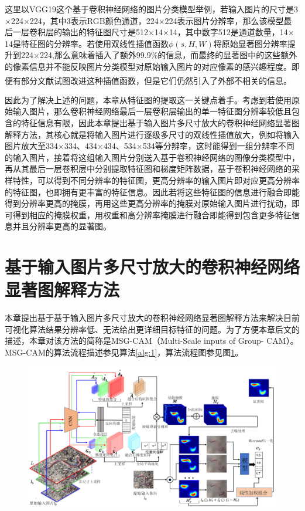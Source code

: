 这里以VGG19这个基于卷积神经网络的图片分类模型举例，若输入图片的尺寸是3$\times$224$\times$224，其中3表示RGB颜色通道，224$\times$224表示图片分辨率，那么该模型最后一层卷积层的输出的特征图尺寸是512$\times$14$\times$14，其中数字512是通道数量，14$\times$14是特征图的分辨率。若使用双线性插值函数$\phi(s,H,W)$将原始显著图分辨率提升到224$\times$224,那么意味着插入了额外99.9\%的信息，而最终的显著图中的这些额外的像素信息并不能反映图片分类模型对原始输入图片的对应像素的感兴趣程度。即便有部分文献\textsuperscript{\cite{adebayo2018sanity,selvaraju2017grad}}试图改进这种插值函数，但是它们仍然引入了外部不相关的信息。

因此为了解决上述的问题，本章从特征图的提取这一关键点着手。考虑到若使用原始输入图片，那么卷积神经网络最后一层卷积层输出的单一特征图分辨率较低且包含的特征信息有限，因此本章提出基于输入图片多尺寸放大的卷积神经网络显著图解释方法，其核心就是将输入图片进行逐级多尺寸的双线性插值放大，例如将输入图片放大至334$\times$334、434$\times$434、534$\times$534等分辨率，这时能得到一组分辨率不同的输入图片，接着将这组输入图片分别送入基于卷积神经网络的图像分类模型中，再从其最后一层卷积层中分别提取特征图和梯度矩阵数据，基于卷积神经网络的采样特性，可以得到不同分辨率的特征图，更高分辨率的输入图片即对应更高分辨率的特征图，也即拥有更丰富的特征信息。因此若将这些特征图的信息进行融合即能得到分辨率更高的掩膜，再用这些更高分辨率的掩膜对原始输入图片进行扰动，即可得到相应的掩膜权重，用权重和高分辨率掩膜进行融合即能得到包含更多特征信息并且分辨率更高的显著图。


\section{基于输入图片多尺寸放大的卷积神经网络显著图解释方法}\label{3:method}
本章提出基于基于输入图片多尺寸放大的卷积神经网络显著图解释方法来解决目前可视化算法结果分辨率低、无法给出更详细目标特征的问题。为了方便本章后文的描述，本章对该方法的简称是MSG-CAM（Multi-Scale inputs of Group-
CAM）。MSG-CAM的算法流程描述参见算法\ref{alg:1}，算法流程图参见图\ref{fig:msg_pipeline}。

\begin{figure}[!ht]
	\centering 
	\includegraphics[width=15cm]{fig/ch3/msg_pipeline.png}
	\label{fig:msg_pipeline}
\end{figure}


